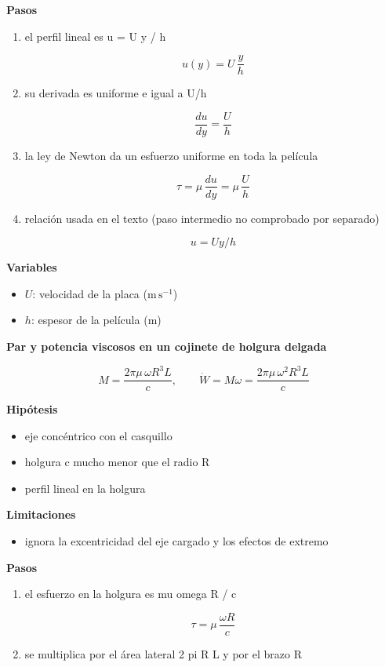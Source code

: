 \documentclass[10pt,openany]{book}
\begin{document}
\begin{tcolorbox}[title={Desarrollos del modelo}, studiumdef, breakable]
\noindent\textbf{Pasos}
\begin{enumerate}
\item
el perfil lineal es u = U y / h

\[
u(y) = U\,\frac{y}{h}
\]
\item
su derivada es uniforme e igual a U/h

\[
\frac{du}{dy} = \frac{U}{h}
\]
\item
la ley de Newton da un esfuerzo uniforme en toda la película

\[
\tau = \mu\,\frac{du}{dy} = \mu\,\frac{U}{h}
\]
\item
relación usada en el texto (paso intermedio no comprobado por separado)

\[
u = Uy/h
\]
\end{enumerate}

\noindent\textbf{Variables}
\begin{itemize}
\item $U$: velocidad de la placa ($\mathrm{m}\,\mathrm{s}^{-1}$)
\item $h$: espesor de la película ($\mathrm{m}$)
\end{itemize}



\noindent\textbf{Par y potencia viscosos en un cojinete de holgura delgada}

\begin{equation}
M = \frac{2\pi\mu\,\omega R^{3} L}{c},\qquad \dot W = M\omega = \frac{2\pi\mu\,\omega^{2} R^{3} L}{c}
\label{eq:c03-petroff}
\end{equation}

\noindent\textbf{Hipótesis}
\begin{itemize}
\item eje concéntrico con el casquillo
\item holgura c mucho menor que el radio R
\item perfil lineal en la holgura
\end{itemize}

\noindent\textbf{Limitaciones}
\begin{itemize}
\item ignora la excentricidad del eje cargado y los efectos de extremo
\end{itemize}

\noindent\textbf{Pasos}
\begin{enumerate}
\item
el esfuerzo en la holgura es mu omega R / c

\[
\tau = \mu\,\frac{\omega R}{c}
\]
\item
se multiplica por el área lateral 2 pi R L y por el brazo R


\end{enumerate}
\end{tcolorbox}
\end{document}
